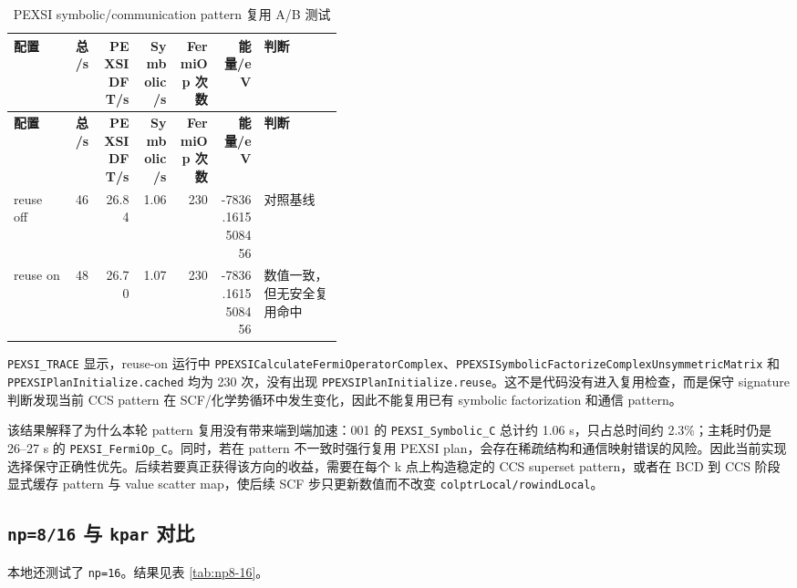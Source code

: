 \documentclass[a4paper,11pt]{article}
\newcommand{\code}[1]{\texttt{#1}}
\begin{document}
{\scriptsize
\begin{longtable}{@{}p{0.18\linewidth}r r r r r p{0.24\linewidth}@{}}
\caption{PEXSI symbolic/communication pattern 复用 A/B 测试}
\label{tab:pattern-reuse-ab}\\
\toprule
\textbf{配置} & \textbf{总/s} & \textbf{PEXSIDFT/s} & \textbf{Symbolic/s} & \textbf{FermiOp 次数} & \textbf{能量/eV} & \textbf{判断}\\
\midrule
\endfirsthead
\toprule
\textbf{配置} & \textbf{总/s} & \textbf{PEXSIDFT/s} & \textbf{Symbolic/s} & \textbf{FermiOp 次数} & \textbf{能量/eV} & \textbf{判断}\\
\midrule
\endhead
reuse off & 46 & 26.84 & 1.06 & 230 & -7836.1615508456 & 对照基线\\
reuse on & 48 & 26.70 & 1.07 & 230 & -7836.1615508456 & 数值一致，但无安全复用命中\\
\bottomrule
\end{longtable}
}

\code{PEXSI\_TRACE} 显示，reuse-on 运行中 \code{PPEXSICalculateFermiOperatorComplex}、\code{PPEXSISymbolicFactorizeComplexUnsymmetricMatrix} 和 \code{PPEXSIPlanInitialize.cached} 均为 230 次，没有出现 \code{PPEXSIPlanInitialize.reuse}。这不是代码没有进入复用检查，而是保守 signature 判断发现当前 CCS pattern 在 SCF/化学势循环中发生变化，因此不能复用已有 symbolic factorization 和通信 pattern。

该结果解释了为什么本轮 pattern 复用没有带来端到端加速：001 的 \code{PEXSI\_Symbolic\_C} 总计约 1.06 s，只占总时间约 2.3\%；主耗时仍是 26--27 s 的 \code{PEXSI\_FermiOp\_C}。同时，若在 pattern 不一致时强行复用 PEXSI plan，会存在稀疏结构和通信映射错误的风险。因此当前实现选择保守正确性优先。后续若要真正获得该方向的收益，需要在每个 k 点上构造稳定的 CCS superset pattern，或者在 BCD 到 CCS 阶段显式缓存 pattern 与 value scatter map，使后续 SCF 步只更新数值而不改变 \code{colptrLocal/rowindLocal}。

\subsection{\code{np=8/16} 与 \code{kpar} 对比}

本地还测试了 \code{np=16}。结果见表 \ref{tab:np8-16}。
\end{document}
